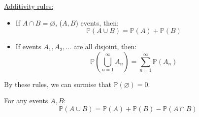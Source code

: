 \documentclass{article} \usepackage[utf8]{inputenc}
\begin{document}
\underline{Additivity rules:}
\begin{itemize}
\item If $A \cap B = \varnothing$, ($A, B$) events, then:
  \begin{equation} \boxed{\mathbb{P}(A \cup B) = \mathbb{P}(A) +
      \mathbb{P}(B)}
  \end{equation}

\item If events $A_1, A_2, \dots$ are all disjoint, then:
  \begin{equation} \boxed{ \mathbb{P} (\bigcup\limits_{n=1}^{\infty}
      A_n) = \sum_{n=1}^{\infty} \mathbb{P}(A_n) }
  \end{equation}
\end{itemize}

By these rules, we can surmise that $\boxed{\mathbb{P} (\varnothing) =
  0}$.

For any events $A, B$:
\begin{equation}
  \tag{Event Union}
  \boxed{
    \mathbb{P}(A \cup B) = \mathbb{P}(A) + \mathbb{P}(B) -
    \mathbb{P}(A \cap B)
  }
\end{equation}
\end{document}
